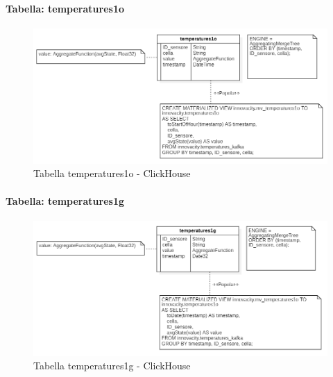       \paragraph{Tabella: temperatures1o}
      \begin{figure}[H]
          \centering
          \includegraphics[width=1\textwidth]{../Images/SpecificaTecnica/temperatures1o.PNG}
          \caption{Tabella temperatures1o - ClickHouse}
          \label{fig:temperatures1o}
        \end{figure}
    \paragraph{Tabella: temperatures1g}
    \begin{figure}[H]
        \centering
        \includegraphics[width=1\textwidth]{../Images/SpecificaTecnica/temperatures1g.PNG}
        \caption{Tabella temperatures1g - ClickHouse}
        \label{fig:temperatures1g}
        \end{figure}
